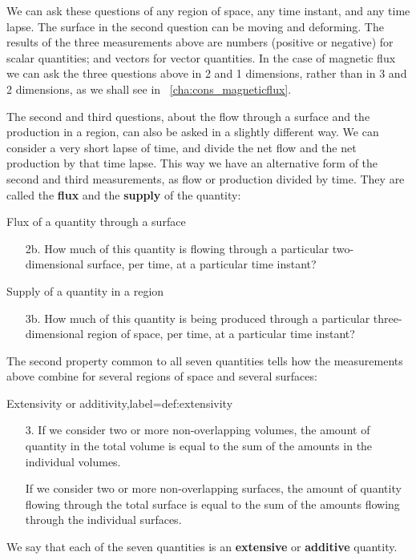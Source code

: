 We can ask these questions of any region of space, any time instant, and any time lapse. The surface in the second question can be moving and deforming. The results of the three measurements above are numbers (positive or negative) for scalar quantities; and vectors for vector quantities. In the case of magnetic flux we can ask the three questions above in 2 and 1 dimensions, rather than in 3 and 2 dimensions, as we shall see in \chap~\ref{cha:cons_magneticflux}.

The second and third questions, about the flow through a surface and the production in a region, can also be asked in a slightly different way. We can consider a very short lapse of time, and divide the net flow and the net production by that time lapse. This way we have an alternative form of the second and third measurements, as flow or production divided by time. They are called the \textbf{flux} and the \textbf{supply} of the quantity:
\begin{definition}{Flux of a quantity through a surface}
  \begin{enumerate}[label=\arabic*.]\bfseries
  \item[2b.] How much of this quantity is flowing through a particular two-dimensional surface, per time, at a particular time instant?
  \end{enumerate}
\end{definition}

\begin{definition}{Supply of a quantity in a region}
  \begin{enumerate}[label=\arabic*.]\bfseries
  \item[3b.] How much of this quantity is being produced through a particular three-dimensional region of space, per time, at a particular time instant?
  \end{enumerate}
\end{definition}

\medskip

The second property common to all seven quantities tells how the measurements above combine for several regions of space and several surfaces:
\begin{definition}{Extensivity or additivity,label={def:extensivity}}
\begin{enumerate}[label=\arabic*.]\bfseries
  \item[3.]  If we consider two or more non-overlapping volumes, the amount of quantity in the total volume is equal to the sum of the amounts in the individual volumes.

    If we consider two or more non-overlapping surfaces, the amount of quantity flowing through the total surface is equal to the sum of the amounts flowing through the individual surfaces.
  \end{enumerate}

We say that each of the seven quantities is an \textbf{extensive} or \textbf{additive} quantity.
\end{definition}

